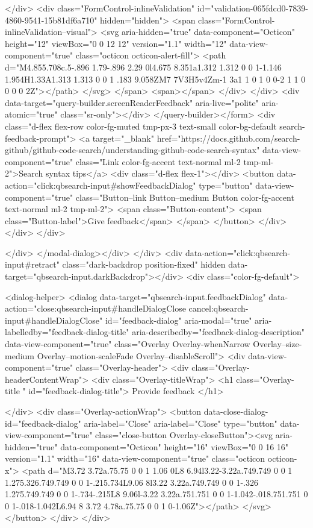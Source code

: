         </div>
      <div class="FormControl-inlineValidation" id="validation-065fdcd0-7839-4860-9541-15b81df6a710" hidden="hidden">
        <span class="FormControl-inlineValidation--visual">
          <svg aria-hidden="true" data-component="Octicon" height="12" viewBox="0 0 12 12" version="1.1" width="12" data-view-component="true" class="octicon octicon-alert-fill">
    <path d="M4.855.708c.5-.896 1.79-.896 2.29 0l4.675 8.351a1.312 1.312 0 0 1-1.146 1.954H1.33A1.313 1.313 0 0 1 .183 9.058ZM7 7V3H5v4Zm-1 3a1 1 0 1 0 0-2 1 1 0 0 0 0 2Z"></path>
</svg>
        </span>
        <span></span>
</div>    </div>
    <div data-target="query-builder.screenReaderFeedback" aria-live="polite" aria-atomic="true" class="sr-only"></div>
</query-builder></form>
          <div class="d-flex flex-row color-fg-muted tmp-px-3 text-small color-bg-default search-feedback-prompt">
            <a target="_blank" href="https://docs.github.com/search-github/github-code-search/understanding-github-code-search-syntax" data-view-component="true" class="Link color-fg-accent text-normal ml-2 tmp-ml-2">Search syntax tips</a>            <div class="d-flex flex-1"></div>
              <button data-action="click:qbsearch-input#showFeedbackDialog" type="button" data-view-component="true" class="Button--link Button--medium Button color-fg-accent text-normal ml-2 tmp-ml-2">  <span class="Button-content">
    <span class="Button-label">Give feedback</span>
  </span>
</button>
          </div>
        </div>
</div>

    </div>
</modal-dialog></div>
  </div>
  <div data-action="click:qbsearch-input#retract" class="dark-backdrop position-fixed" hidden data-target="qbsearch-input.darkBackdrop"></div>
  <div class="color-fg-default">
    
<dialog-helper>
  <dialog data-target="qbsearch-input.feedbackDialog" data-action="close:qbsearch-input#handleDialogClose cancel:qbsearch-input#handleDialogClose" id="feedback-dialog" aria-modal="true" aria-labelledby="feedback-dialog-title" aria-describedby="feedback-dialog-description" data-view-component="true" class="Overlay Overlay-whenNarrow Overlay--size-medium Overlay--motion-scaleFade Overlay--disableScroll">
    <div data-view-component="true" class="Overlay-header">
  <div class="Overlay-headerContentWrap">
    <div class="Overlay-titleWrap">
      <h1 class="Overlay-title " id="feedback-dialog-title">
        Provide feedback
      </h1>
        
    </div>
    <div class="Overlay-actionWrap">
      <button data-close-dialog-id="feedback-dialog" aria-label="Close" aria-label="Close" type="button" data-view-component="true" class="close-button Overlay-closeButton"><svg aria-hidden="true" data-component="Octicon" height="16" viewBox="0 0 16 16" version="1.1" width="16" data-view-component="true" class="octicon octicon-x">
    <path d="M3.72 3.72a.75.75 0 0 1 1.06 0L8 6.94l3.22-3.22a.749.749 0 0 1 1.275.326.749.749 0 0 1-.215.734L9.06 8l3.22 3.22a.749.749 0 0 1-.326 1.275.749.749 0 0 1-.734-.215L8 9.06l-3.22 3.22a.751.751 0 0 1-1.042-.018.751.751 0 0 1-.018-1.042L6.94 8 3.72 4.78a.75.75 0 0 1 0-1.06Z"></path>
</svg></button>
    </div>
  </div>
  
